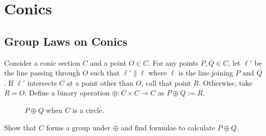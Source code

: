 \chapter{Conics}

\section{Group Laws on Conics}

Consider a conic section $C$ and a point $O \in C$. For any points $P,Q \in C$,
let $\ell'$ be the line passing through $O$ such that $\ell' \| \ell$ where
$\ell$ is the line joining $P$ and $Q$. If $\ell'$ intersects $C$ at a point
other than $O$, call that point $R$. Otherwise, take $R=O$. Define a binary
operation $\oplus : C \times C \to C$ as $P \oplus Q := R$.
\vspace{1ex}

\begin{figure}[H]
    \center

    \label{fig}
    \caption{$P \oplus Q$ when $C$ is a circle.}
\end{figure}

\noindent
Show that $C$ forms a group under $\oplus$ and find formulae to calculate
$P \oplus Q$.
